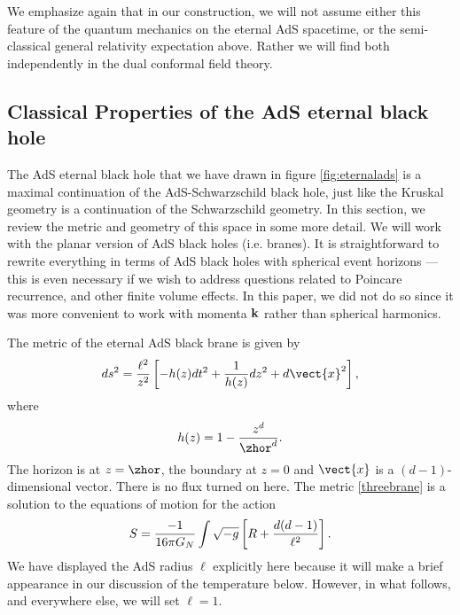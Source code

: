  



We emphasize again that in our construction, we will not assume either this feature of the quantum mechanics on the eternal AdS spacetime, or the semi-classical general relativity expectation above. Rather we will find both independently in the dual conformal field theory. 



\subsection{Classical Properties of the AdS eternal black hole \label{secadseternal}}

The AdS eternal black hole that we have drawn in figure \ref{fig:eternalads} is a maximal continuation of the AdS-Schwarzschild black hole, just like the Kruskal geometry is a continuation of the Schwarzschild geometry. In this section, we review the metric and geometry of this space in some more detail.
We will  work with the planar version of AdS black holes (i.e. branes). It is straightforward to rewrite everything in terms of AdS black holes with spherical event horizons --- this is even necessary if we wish to address questions related to Poincare recurrence, and other finite volume effects. In this paper, we did not do so since it was more convenient to work with momenta ${\bf k}$ rather than spherical harmonics. 

The metric of the eternal AdS black brane is given by
\begin{equation}
\label{threebrane}
ds^2 = {\ell^2 \over z^2} \left[-h(z) dt^2 + {1 \over h(z)} dz^2 + d\vect{x}^2 \right],
\end{equation}
where \[
h(z) = 1-{z^d \over \zhor^d}.
\]
The horizon is at $z=\zhor$, the boundary at $z=0$ and $\vect{x}$ is a $(d-1)$-dimensional vector. There is no flux turned on here. The metric \eqref{threebrane} is a solution to the equations of motion for the action
\[
S = {-1 \over 16 \pi G_N} \int \sqrt{-g} \left[R + {d(d-1) \over \ell^2} \right].
\]
We have displayed the AdS radius $\ell$ explicitly here because it will make a brief appearance in our discussion of the temperature below.  However, in what follows, and everywhere else,  we will set $\ell = 1$.

